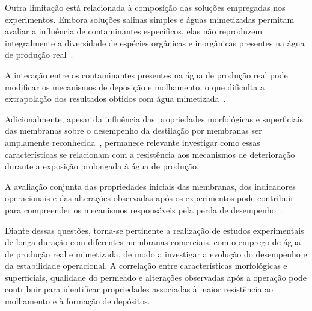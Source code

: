Outra limitação está relacionada à composição das soluções empregadas nos experimentos. Embora soluções salinas simples e águas mimetizadas permitam avaliar a influência de contaminantes específicos, elas não reproduzem integralmente a diversidade de espécies orgânicas e inorgânicas presentes na água de produção real~\cite{Rajbongshi2024ProducedWaterReview,w15234088,Singh2011DCMD}. 

A interação entre os contaminantes presentes na água de produção real pode modificar os mecanismos de deposição e molhamento, o que dificulta a extrapolação dos resultados obtidos com água mimetizada~\cite{Abdelrazeq2022DCMD,Hsieh2021Pretreatments,Nawaz2021FO_MD}.

Adicionalmente, apesar da influência das propriedades morfológicas e superficiais das membranas sobre o desempenho da destilação por membranas ser amplamente reconhecida~\cite{Su2017,Woo2021ElectrospunMD,Suga2021VMD}, permanece relevante investigar como essas características se relacionam com a resistência aos mecanismos de deterioração durante a exposição prolongada à água de produção. 

A avaliação conjunta das propriedades iniciais das membranas, dos indicadores operacionais e das alterações observadas após os experimentos pode contribuir para compreender os mecanismos responsáveis pela perda de desempenho~\cite{Yao2020WettabilityMD,Abdelrazeq2022DCMD,Hsieh2021Pretreatments}.

Diante dessas questões, torna-se pertinente a realização de estudos experimentais de longa duração com diferentes membranas comerciais, com o emprego de água de produção real e mimetizada, de modo a investigar a evolução do desempenho e da estabilidade operacional. A correlação entre características morfológicas e superficiais, qualidade do permeado e alterações observadas após a operação pode contribuir para identificar propriedades associadas à maior resistência ao molhamento e à formação de depósitos.



